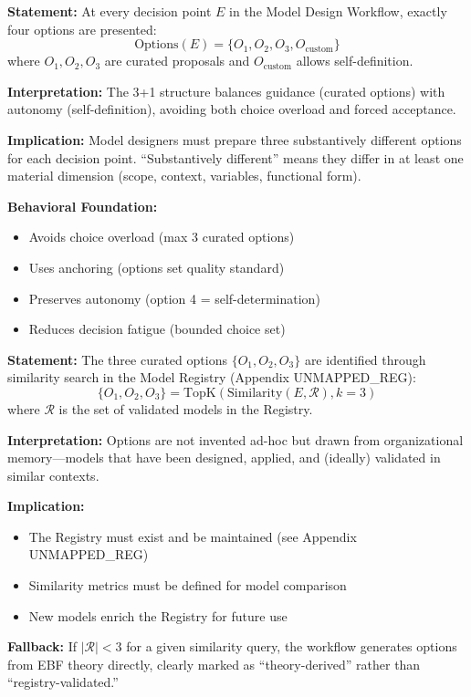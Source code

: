 \begin{tcolorbox}[colback=gray!5!white, colframe=gray!75!black,
    title=Axiom MD-1: 3+1 Choice Architecture]
\textbf{Statement:} At every decision point $E$ in the Model Design Workflow,
exactly four options are presented:
\begin{equation}
\text{Options}(E) = \{O_1, O_2, O_3, O_{\text{custom}}\}
\end{equation}
where $O_1, O_2, O_3$ are curated proposals and $O_{\text{custom}}$ allows
self-definition.

\textbf{Interpretation:} The 3+1 structure balances guidance (curated options)
with autonomy (self-definition), avoiding both choice overload and forced acceptance.

\textbf{Implication:} Model designers must prepare three substantively different
options for each decision point. ``Substantively different'' means they differ
in at least one material dimension (scope, context, variables, functional form).

\textbf{Behavioral Foundation:}
\begin{itemize}[nosep]
\item Avoids choice overload (max 3 curated options)
\item Uses anchoring (options set quality standard)
\item Preserves autonomy (option 4 = self-determination)
\item Reduces decision fatigue (bounded choice set)
\end{itemize}
\end{tcolorbox}

\begin{tcolorbox}[colback=gray!5!white, colframe=gray!75!black,
    title=Axiom MD-2: Registry-Based Option Selection]
\textbf{Statement:} The three curated options $\{O_1, O_2, O_3\}$ are identified
through similarity search in the Model Registry (Appendix UNMAPPED_REG):
\begin{equation}
\{O_1, O_2, O_3\} = \text{TopK}\left(\text{Similarity}(E, \mathcal{R}), k=3\right)
\end{equation}
where $\mathcal{R}$ is the set of validated models in the Registry.

\textbf{Interpretation:} Options are not invented ad-hoc but drawn from
organizational memory---models that have been designed, applied, and
(ideally) validated in similar contexts.

\textbf{Implication:}
\begin{itemize}[nosep]
\item The Registry must exist and be maintained (see Appendix UNMAPPED_REG)
\item Similarity metrics must be defined for model comparison
\item New models enrich the Registry for future use
\end{itemize}

\textbf{Fallback:} If $|\mathcal{R}| < 3$ for a given similarity query,
the workflow generates options from EBF theory directly, clearly marked
as ``theory-derived'' rather than ``registry-validated.''
\end{tcolorbox}

